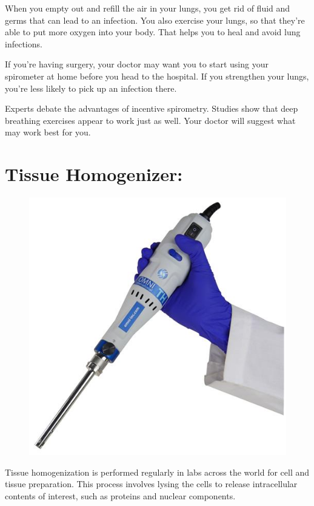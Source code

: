 \documentclass[a4paper,12pt]{article}
\begin{document}
 When you empty out and refill the air in your lungs, you get rid of fluid and germs that can lead to an infection. You also exercise your lungs, so that they’re able to put more oxygen into your body. That helps you to heal and avoid lung infections.

If you’re having surgery, your doctor may want you to start using your spirometer at home before you head to the hospital. If you strengthen your lungs, you’re less likely to pick up an infection there.

Experts debate the advantages of incentive spirometry. Studies show that deep breathing exercises appear to work just as well. Your doctor will suggest what may work best for you. 
  
  
  
 \section{Tissue Homogenizer:}
 
 \begin{figure}[h]
\includegraphics[scale=1]{tis.jpg}
\end{figure}
 \medspace
  
Tissue homogenization is performed regularly in labs across the world for cell and tissue preparation. This process involves lysing the cells to release intracellular contents of interest, such as proteins and nuclear components.
  
\end{document}
